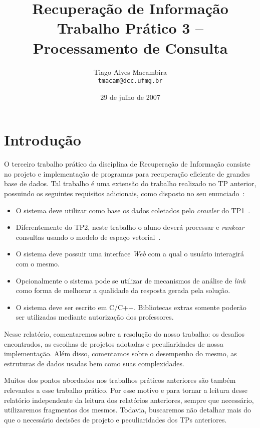 \documentclass[10pt,twocolumn]{article}
\title{Recuperação de Informação \\Trabalho Prático 3 -- Processamento
de Consulta}
\author{Tiago Alves Macambira \\ \texttt{tmacam@dcc.ufmg.br}}
\date{29 de julho de 2007}
\begin{document}
\maketitle

\section{Introdução}

O terceiro trabalho prático da disciplina de Recuperação de Informação
consiste no projeto e implementação de programas para
recuperação eficiente de grandes base de dados. Tal trabalho é uma
extensão do trabalho realizado no TP anterior, possuindo os seguintes
requisitos adicionais, como disposto no seu enunciado~\cite{tp3}:
\begin{itemize}
\item O sistema deve utilizar como base os dados coletados pelo
\emph{crawler} do TP1~\cite{tp1}.
\item Diferentemente do TP2, neste trabalho o aluno deverá processar e
\emph{rankear} consultas usando o modelo de espaço
vetorial~\cite{tp2}.
\item O sistema deve possuir uma interface \emph{Web} com a qual
o usuário interagirá com o mesmo.
\item Opcionalmente o sistema pode se utilizar de mecanismos de análise
de \emph{link} como forma de melhorar a qualidade da resposta gerada
pela solução.
\item O sistema deve ser escrito em C/C++. Bibliotecas extras somente
poderão ser utilizadas mediante autorização dos professores.
\end{itemize}

Nesse relatório, comentaremos sobre a resolução do nosso trabalho:
os desafios encontrados, as escolhas de projetos
adotadas e peculiaridades de nossa implementação. Além disso, comentamos
sobre o desempenho do mesmo, as estruturas de dados usadas bem como suas
complexidades.

Muitos dos pontos abordados nos trabalhos práticos anteriores são também
relevantes a esse trabalho prático. Por esse motivo e para tornar a
leitura desse relatório independente da leitura dos relatórios
anteriores, sempre que necessário, utilizaremos fragmentos dos mesmos.
Todavia, buscaremos não detalhar mais do que o necessário decisões
de projeto e peculiaridades dos TPs anteriores.

\end{document}
